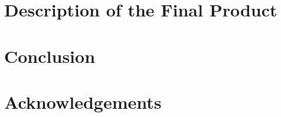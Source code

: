 \documentclass[twocolumn]{article}
\begin{document}
\section{Description of the Final Product}
\vspace{-1ex}


\section{Conclusion}
\vspace{-1ex}


\section*{Acknowledgements}





\end{document}
